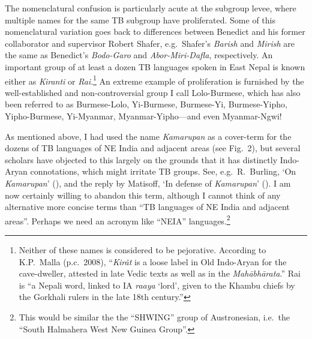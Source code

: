 The nomenclatural confusion is particularly acute at the subgroup levee, where multiple names for the same TB subgroup have proliferated.
Some of this nomenclatural variation goes back
to differences between Benedict and his former collaborator and supervisor
Robert Shafer, %
 e.g.\ Shafer’s \textit{Barish} and \textit{Mirish} are the same as Benedict’s
\textit{Bodo-Garo} and \textit{Abor-Miri-Dafla}, respectively. An important group of at least a
dozen TB languages spoken in East Nepal is known either as \textit{Kiranti} or
\textit{Rai}.\footnote{Neither of these names is considered to be pejorative. According to K.P.~Malla (p.c.~2008), “\textit{Kirãt} is a loose label in Old Indo-Aryan for the cave-dweller, attested in late Vedic texts as well as in the \textit{Mahābhārata}.” Rai is “a Nepali word, linked to IA \textit{raaya} ‘lord’, given to the Khambu chiefs by the Gorkhali rulers in the late 18th century.”}
  An extreme example of proliferation is furnished by the well-established and
non-controversial group I call Lolo-Burmese, which has also been referred to as
Burmese-Lolo, Yi-Burmese, Burmese-Yi, Burmese-Yipho, Yipho-Burmese, Yi-Myanmar,
Myanmar-Yipho—and even Myanmar-Ngwi!

As mentioned above, I had used the name \textit{Kamarupan} as a cover-term for the dozens of TB languages of NE India and adjacent areas (see Fig.~2), but several scholars have objected to this
largely on the grounds that it has distinctly Indo-Aryan connotations, which
might irritate TB groups. See, e.g.\ R.~Burling, ‘On \textit{Kamarupan}’ (\citeyear{RB-OK}), and the reply by Matisoff, ‘In defense of \textit{Kamarupan}’ (\citeyear{JAM-IDK}). 
I am now certainly willing to abandon this term, although I cannot think of any alternative more concise terms than “TB languages of NE India and adjacent areas”. Perhaps we need an acronym like “NEIA” languages.\footnote{This would be similar the the “SHWING” group of Austronesian, i.e.\ the “South Halmahera West New Guinea Group”.}

